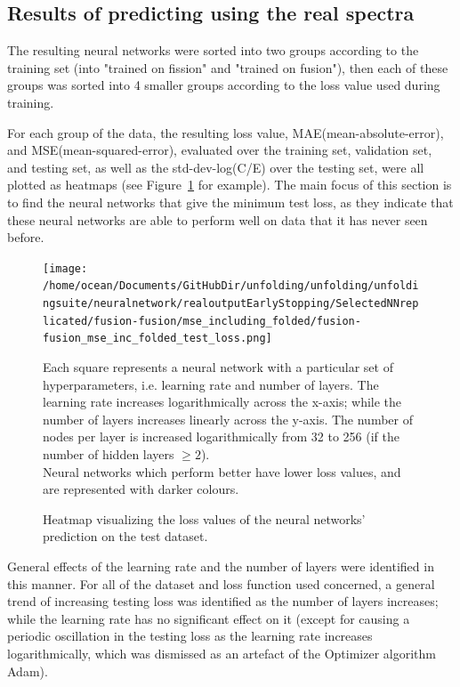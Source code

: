 \documentclass[a4paper, 12pt]{article}
\begin{document}
\subsection{Results of predicting using the real spectra}
    The resulting neural networks were sorted into two groups according to the training set (into "trained on fission" and "trained on fusion"), then each of these groups was sorted into 4 smaller groups according to the loss value used during training.

    For each group of the data, the resulting loss value, MAE(mean-absolute-error), and MSE(mean-squared-error), evaluated over the training set, validation set, and testing set, as well as the std-dev-log(C/E) over the testing set, were all plotted as heatmaps (see Figure~\ref{hyperparametersearchTestLoss} for example). The main focus of this section is to find the neural networks that give the minimum test loss, as they indicate that these neural networks are able to perform well on data that it has never seen before.

\begin{figure}
\centering
\texttt{[image: /home/ocean/Documents/GitHubDir/unfolding/unfolding/unfoldingsuite/neuralnetwork/realoutputEarlyStopping/SelectedNNreplicated/fusion-fusion/mse\_including\_folded/fusion-fusion\_mse\_inc\_folded\_test\_loss.png]}
\caption{Heatmap visualizing the loss values of the neural networks' prediction on the test dataset.}\label{hyperparametersearchTestLoss}
Each square represents a neural network with a particular set of hyperparameters, i.e. learning rate and number of layers. The learning rate increases logarithmically across the x-axis; while the number of layers increases linearly across the y-axis. The number of nodes per layer is increased logarithmically from 32 to 256 (if the number of hidden layers $\ge 2$).\\
Neural networks which perform better have lower loss values, and are represented with darker colours.\\
\end{figure}

    General effects of the learning rate and the number of layers were identified in this manner. For all of the dataset and loss function used concerned, a general trend of increasing testing loss was identified as the number of layers increases; while the learning rate has no significant effect on it (except for causing a periodic oscillation in the testing loss as the learning rate increases logarithmically, which was dismissed as an artefact of the Optimizer algorithm Adam).
\end{document}
